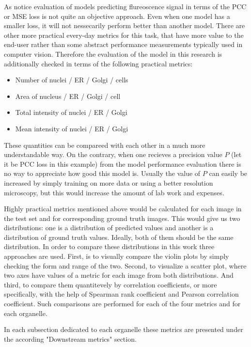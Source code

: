 
As \cite{Lachance_2020} notice evaluation of models predicting flureoscence signal in terms of the PCC or MSE loss is not quite an objective approach. Even when one model has a smaller loss, it will not nessecarily perform better than another model. There are other more practical every-day metrics for this task, that have more value to the end-user rather than some abstract performance measurements typically used in computer vision. Therefore the evaluation of the model in this research is additionally checked in terms of the following practical metrics:
\begin{itemize}
    \item Number of nuclei / ER / Golgi / cells
    \item Area of nucleus / ER / Golgi / cell
    \item Total intensity of nuclei / ER / Golgi
    \item Mean intensity of nuclei / ER / Golgi
\end{itemize}

These quantities can be compareed with each other in a much more understandable way. On the contrary, when one recieves a precision value $P$ (let it be PCC loss in this example) from the model performance evaluation there is no way to appreciate how good this model is. Usually the value of $P$ can easily be increased by simply training on more data or using a better resolution microscopy, but this would increase the amount of lab work and expenses.

Highly practical metrics mentioned above would be calculated for each image in the test set and for corresponding ground truth images. This would give us two distributions: one is a distribution of predicted values and another is a distribution of ground truth values. Ideally, both of them should be the same distribution. In order to compare these distributions in this work three approaches are used. First, is to visually compare the violin plots by simply checking the form and range of the two. Second, to visualize a scatter plot, where two axes have values of a metric for each image from both distributions. And third, to compare them quantitevely by correlation coefficients, or more specifically, with the help of Spearman rank coefficient and Pearson correlation coefficient. Such comparisons are performed for each of the four metrics and for each organelle.

In each subsection dedicated to each organelle these metrics are presented under the according "Downstream metrics" section.